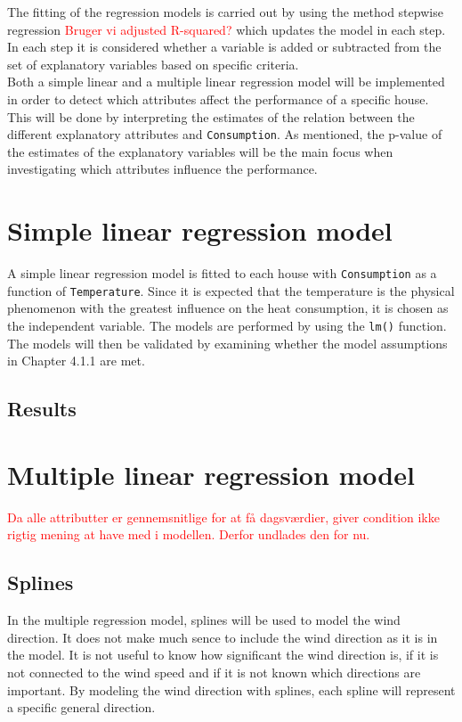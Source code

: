 \noindent The fitting of the regression models is carried out by using the method stepwise regression \textcolor{red}{Bruger vi adjusted R-squared?} which updates the model in each step. In each step it is considered whether a variable is added or subtracted from the set of explanatory variables based on specific criteria. \\

\noindent Both a simple linear and a multiple linear regression model will be implemented in order to detect which attributes affect the performance of a specific house. This will be done by interpreting the estimates of the relation between the different explanatory attributes and \texttt{Consumption}. As mentioned, the p-value of the estimates of the explanatory variables will be the main focus when investigating which attributes influence the performance. 

\section{Simple linear regression model}
A simple linear regression model is fitted to each house with \texttt{Consumption} as a function of \texttt{Temperature}. Since it is expected that the temperature is the physical phenomenon with the greatest influence on the heat consumption, it is chosen as the independent variable. The models are performed by using the \texttt{lm()} function. The models will then be validated by examining whether the model assumptions in Chapter 4.1.1 are met. \\

\noindent 


\subsection{Results}

\section{Multiple linear regression model}

\textcolor{red}{Da alle attributter er gennemsnitlige for at få dagsværdier, giver condition ikke rigtig mening at have med i modellen. Derfor undlades den for nu.}

\subsection{Splines}
In the multiple regression model, splines will be used to model the wind direction. It does not make much sence to include the wind direction as it is in the model. It is not useful to know how significant the wind direction is, if it is not connected to the wind speed and if it is not known which directions are important. By modeling the wind direction with splines, each spline will represent a specific general direction.


